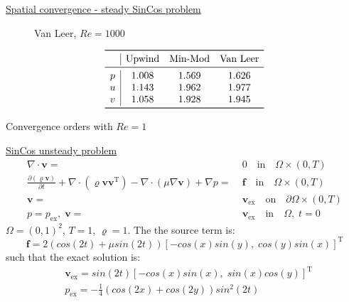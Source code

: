 \documentclass{beamer}
\begin{document}
\begin{frame}{\hyperlink{spaceconv}{Spatial convergence - steady SinCos 
problem}}
\begin{figure}
	\centering
	
	\caption{\tiny Van Leer, $Re=1000$}
\end{figure}
\vspace{-0.3cm}
\begin{table}\footnotesize
	\[
	\begin{array}{c|ccc}
	\toprule
	& \text{Upwind} & \text{Min-Mod} & \text{Van Leer} \\ 
	\midrule
	p & 1.008 & 1.569 & 1.626\\
	u & 1.143 & 1.962 & 1.977\\
	v & 1.058 & 1.928 & 1.945\\
	\bottomrule
	\end{array}
	\]
	\caption{\tiny Convergence orders with $Re = 1$}
\end{table}
\end{frame}
\begin{frame}[label=timeconvSupp]{\hyperlink{timeconv}{SinCos unsteady problem}}
\begin{align*}
\nabla \cdot \mathbf{v} =& \; 0 \quad \text{in} \quad \Omega \times (0,T)\\
\frac{\partial (\varrho \mathbf{v})}{\partial t} + \nabla \cdot (\varrho 
\mathbf{v} \mathbf{v^\mathrm{T}}) - \nabla \cdot (\mu 
\nabla \mathbf{v}) + \nabla p =& \; \mathbf{f} \quad \text{in} \quad \Omega 
\times (0,T)\\
\mathbf{v} =& \; \mathbf{v}_\text{ex} \quad \text{on} \quad \partial \Omega 
\times (0,T)
\\p=p_\text{ex},\;\mathbf{v} =&\; \mathbf{v}_\text{ex} \quad \text{in} \quad 
\Omega, \; t=0
\end{align*}
$\Omega = (0,1)^2$, $T=1$, $\varrho = 1$. The the source term is:
\begin{equation*}
\mathbf{f} = 2(cos(2t)+\mu sin(2t))[-cos(x) sin(y), \; cos(y) sin(x)]^\mathrm{T}
\end{equation*}
such that the exact solution is:
\begin{align*}
&\mathbf{v}_\text{ex} = sin(2t)[-cos(x) sin(x), \; sin(x) cos(y)]^\mathrm{T}\\
&p_\text{ex} = -\frac{1}{4} (cos(2x)+cos(2y))sin^2(2t)
\end{align*}
\end{frame}
\end{document}
